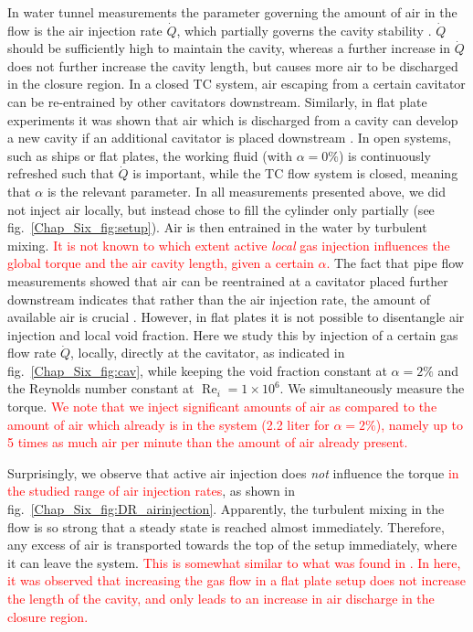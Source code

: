 \documentclass[aps,onecolumn,10pt, floatfix, superscriptaddress,longbibliography, pra]{revtex4-1}
\newcommand{\red}[1]{\textcolor{red}{#1}}
\renewcommand{\Re}{\operatorname{Re}}
\begin{document}
In water tunnel measurements the parameter governing the amount of air in the flow is the air injection rate $\dot{Q}$, which partially governs the cavity stability \citep{Zverkhovskyi2014}. $\dot{Q}$ should be sufficiently high to maintain the cavity, whereas a further increase in $\dot{Q}$ does not further increase the cavity length, but causes more air to be discharged in the closure region. 
In a closed TC system, air escaping from a certain cavitator can be re-entrained by other cavitators downstream. Similarly, in flat plate experiments it was shown that air which is discharged from a cavity can develop a new cavity if an additional cavitator is placed downstream \citep{Zverkhovskyi2014}. In open systems, such as ships or flat plates, the working fluid (with $\alpha=0\%$) is continuously refreshed such that $\dot{Q}$ is important, while the TC flow system is closed, meaning that $\alpha$ is the relevant parameter.
In all measurements presented above, we did not inject air locally, but instead chose to fill the cylinder only partially (see fig.\ \ref{Chap_Six_fig:setup}). Air is then entrained in the water by turbulent mixing. \red{It is not known to which extent active {\it local} gas injection influences the global torque and the air cavity length, given a certain $\alpha$.} 
The fact that pipe flow measurements showed that air can be reentrained at a cavitator placed further downstream indicates that rather than the air injection rate, the amount of available air is crucial \citep{Zverkhovskyi2014}. However, in flat plates it is not possible to disentangle air injection and local void fraction.
Here we study this by injection of a certain gas flow rate $\dot{Q}$, locally, directly at the cavitator, as indicated in fig.\ \ref{Chap_Six_fig:cav}, while keeping the void fraction constant at $\alpha=2\%$ and the Reynolds number constant at $\Re_i=1\times 10^6$. We simultaneously measure the torque. \red{We note that we inject significant amounts of air as compared to the amount of air which already is in the system (2.2 liter for $\alpha=2\%$), namely up to 5 times as much air per minute than the amount of air already present.} 

Surprisingly, we observe that active air injection does {\it not} influence the torque \red{in the studied range of air injection rates}, as shown in fig.\ \ref{Chap_Six_fig:DR_airinjection}. Apparently, the turbulent mixing in the flow is so strong that a steady state is reached almost immediately. Therefore, any excess of air is transported towards the top of the setup immediately, where it can leave the system. \red{This is somewhat similar to what was found in \citet{Zverkhovskyi2014}. In here, it was observed that increasing the gas flow in a flat plate setup does not increase the length of the cavity, and only leads to an increase in air discharge in the closure region.}
 
\end{document}
